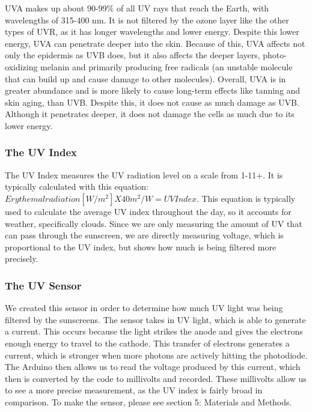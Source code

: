 \documentclass{article}
\begin{document}
UVA makes up about 90-99\% of all UV rays that reach the Earth, with wavelengths of 315-400 nm. It is not filtered by the ozone layer like the other types of UVR, as it has longer wavelengths and lower energy. Despite this lower energy, UVA can penetrate deeper into the skin. Because of this, UVA affects not only the epidermis as UVB does, but it also affects the deeper layers, photo-oxidizing melanin and primarily producing free radicals (an unstable molecule that can build up and cause damage to other molecules). Overall, UVA is in greater abundance and is more likely to cause long-term effects like tanning and skin aging, than UVB. Despite this, it does not cause as much damage as UVB. Although it penetrates deeper, it does not damage the cells as much due to its lower energy.


\subsubsection{The UV Index}
The UV Index measures the UV radiation level on a scale from 1-11+. It is typically calculated with this equation: $Erythemal radiation [W/m^2] X 40m^2/W = UV Index$. This equation is typically used to calculate the average UV index throughout the day, so it accounts for weather, specifically clouds. Since we are only measuring the amount of UV that can pass through the sunscreen, we are directly measuring voltage, which is proportional to the UV index, but shows how much is being filtered more precisely.

\subsubsection{The UV Sensor}
We created this sensor in order to determine how much UV light was being filtered by the sunscreens. The sensor takes in UV light, which is able to generate a current. This occurs because the light strikes the anode and gives the electrons enough energy to travel to the cathode. This transfer of electrons generates a current, which is stronger when more photons are actively hitting the photodiode. The Arduino then allows us to read the voltage produced by this current, which then is converted by the code to millivolts and recorded. These millivolts allow us to see a more precise measurement, as the UV index is fairly broad in comparison. To make the sensor, please see section 5: Materials and Methods. 
\end{document}
